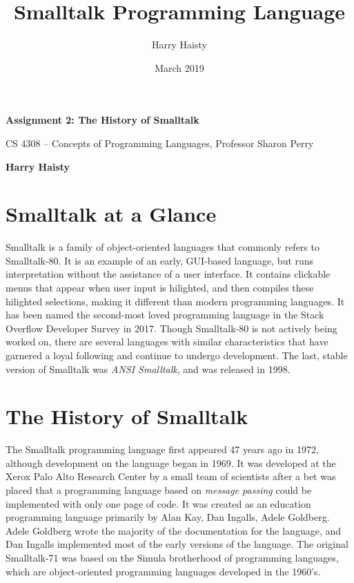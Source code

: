 \documentclass{article}
\title{Smalltalk Programming Language}
\author{Harry Haisty}
\date{March 2019}
\begin{document}
\begin{titlepage}
   \begin{center}
       \vspace*{4cm}
 
       \textbf{Assignment 2: The History of Smalltalk}
 
       \vspace{0.5cm}
        CS 4308 -- Concepts of Programming Languages, Professor Sharon Perry

       \vspace{.5cm}
 
       \textbf{Harry Haisty}
       \vfill
 
       \vspace{0.8cm}
 
   \end{center}
\end{titlepage}

\section*{Smalltalk at a Glance}
Smalltalk is a family of object-oriented languages that commonly refers to Smalltalk-80. It is an example of an early, GUI-based language, but runs interpretation without the assistance of a user interface. It contains clickable menus that appear when user input is hilighted, and then compiles these hilighted selections, making it different than modern programming languages. It has been named the second-most loved programming language in the Stack Overflow Developer Survey in 2017. 
\newline 
Though Smalltalk-80 is not actively being worked on, there are several languages with similar characteristics that have garnered a loyal following and continue to undergo development. The last, stable version of Smalltalk was \textit{ANSI Smalltalk}, and was released in 1998. 

\section*{The History of Smalltalk}
The Smalltalk programming language first appeared 47 years ago in 1972, although development on the language began in 1969. It was developed at the Xerox Palo Alto Research Center by a small team of scientists after a bet was placed that a programming language based on \textit{message passing} could be implemented with only one page of code. It was created as an education programming language primarily by Alan Kay, Dan Ingalls, Adele Goldberg. Adele Goldberg wrote the majority of the documentation for the language, and Dan Ingalls implemented most of the early versions of the language.
\newline
The original Smalltalk-71 was based on the Simula brotherhood of programming languages, which are object-oriented programming languages developed in the 1960's.
\end{document}
